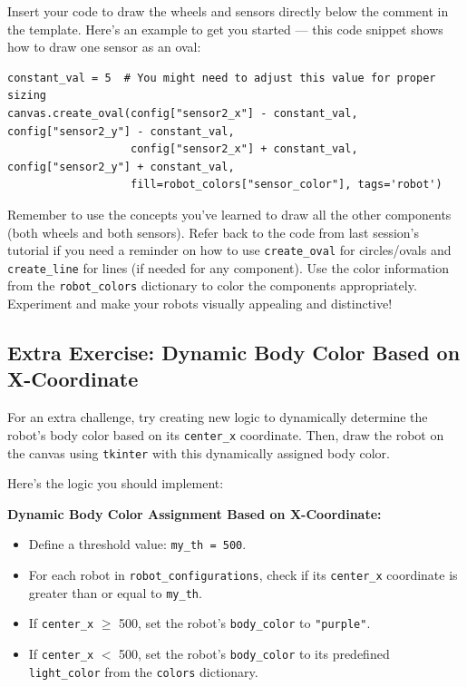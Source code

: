 Insert your code to draw the wheels and sensors directly below the comment in the template. Here's an example to get you started — this code snippet shows how to draw one sensor as an oval:

\begin{verbatim}
constant_val = 5  # You might need to adjust this value for proper sizing
canvas.create_oval(config["sensor2_x"] - constant_val, config["sensor2_y"] - constant_val,
                   config["sensor2_x"] + constant_val, config["sensor2_y"] + constant_val,
                   fill=robot_colors["sensor_color"], tags='robot')
\end{verbatim}

Remember to use the concepts you've learned to draw all the other components (both wheels and both sensors). Refer back to the code from last session's tutorial if you need a reminder on how to use \texttt{create\_oval} for circles/ovals and \texttt{create\_line} for lines (if needed for any component). Use the color information from the \texttt{robot\_colors} dictionary to color the components appropriately. Experiment and make your robots visually appealing and distinctive!

\subsection{Extra Exercise: Dynamic Body Color Based on X-Coordinate}

For an extra challenge, try creating new logic to dynamically determine the robot's body color based on its \texttt{center\_x} coordinate. Then, draw the robot on the canvas using \texttt{tkinter} with this dynamically assigned body color.

Here's the logic you should implement:

\textbf{Dynamic Body Color Assignment Based on X-Coordinate:}

\begin{itemize}
    \item Define a threshold value: \texttt{my\_th = 500}.
    \item For each robot in \texttt{robot\_configurations}, check if its \texttt{center\_x} coordinate is greater than or equal to \texttt{my\_th}.
    \item If \texttt{center\_x} $\geq$ 500, set the robot's \texttt{body\_color} to \texttt{"purple"}.
    \item If \texttt{center\_x} $<$ 500, set the robot's \texttt{body\_color} to its predefined \texttt{light\_color} from the \texttt{colors} dictionary.
\end{itemize}


